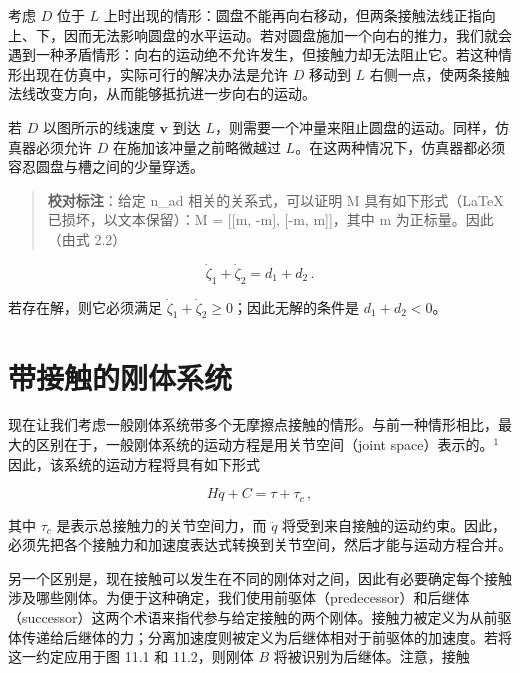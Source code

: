 \documentclass[10pt,a4paper]{book}
\theoremstyle{thmstyle} %
\theoremstyle{defstyle} %
\theoremstyle{prostyle} %
\begin{document}
考虑 $D$ 位于 $L$ 上时出现的情形：圆盘不能再向右移动，但两条接触法线正指向上、下，因而无法影响圆盘的水平运动。若对圆盘施加一个向右的推力，我们就会遇到一种矛盾情形：向右的运动绝不允许发生，但接触力却无法阻止它。若这种情形出现在仿真中，实际可行的解决办法是允许 $D$ 移动到 $L$ 右侧一点，使两条接触法线改变方向，从而能够抵抗进一步向右的运动。



若 $D$ 以图所示的线速度 $\boldsymbol{v}$ 到达 $L$，则需要一个冲量来阻止圆盘的运动。同样，仿真器必须允许 $D$ 在施加该冲量之前略微越过 $L$。在这两种情况下，仿真器都必须容忍圆盘与槽之间的少量穿透。



\begin{quote}

\textbf{校对标注}：给定 n\_ad 相关的关系式，可以证明 M 具有如下形式（LaTeX 已损坏，以文本保留）：M = [[m, -m], [-m, m]]，其中 m 为正标量。因此（由式 2.2）

\end{quote}





$$
\dot { \zeta } _ { 1 } + \dot { \zeta } _ { 2 } = d _ { 1 } + d _ { 2 } \, .
$$



若存在解，则它必须满足 $\dot{\zeta}_1 + \dot{\zeta}_2 \geq 0$；因此无解的条件是 $d_1 + d_2 < 0$。



\section{带接触的刚体系统}





现在让我们考虑一般刚体系统带多个无摩擦点接触的情形。与前一种情形相比，最大的区别在于，一般刚体系统的运动方程是用关节空间（joint space）表示的。$^{1}$ 因此，该系统的运动方程将具有如下形式



$$
H \ddot { q } + C = \tau + \tau _ { c } \, ,
$$



其中 $\tau_{c}$ 是表示总接触力的关节空间力，而 $\ddot{q}$ 将受到来自接触的运动约束。因此，必须先把各个接触力和加速度表达式转换到关节空间，然后才能与运动方程合并。



另一个区别是，现在接触可以发生在不同的刚体对之间，因此有必要确定每个接触涉及哪些刚体。为便于这种确定，我们使用前驱体（predecessor）和后继体（successor）这两个术语来指代参与给定接触的两个刚体。接触力被定义为从前驱体传递给后继体的力；分离加速度则被定义为后继体相对于前驱体的加速度。若将这一约定应用于图 11.1 和 11.2，则刚体 $B$ 将被识别为后继体。注意，接触
\end{document}
